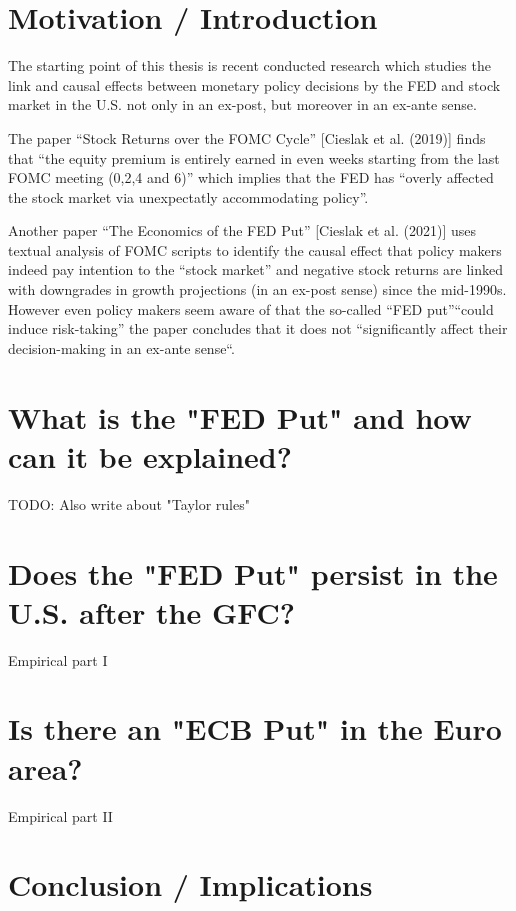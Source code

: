 
\chapter{Motivation / Introduction}

The starting point of this thesis is recent conducted research which studies the link and causal effects between monetary policy decisions by the FED and stock market in the U.S. not only in an ex-post, but moreover in an ex-ante sense.

The paper “Stock Returns over the FOMC Cycle” [Cieslak et al. (2019)] finds that “the equity premium is entirely earned in even weeks starting from the last FOMC meeting (0,2,4 and 6)” which implies that the FED has “overly affected the stock market via unexpectatly accommodating policy”.

Another paper “The Economics of the FED Put”  [Cieslak et al. (2021)] uses textual analysis of FOMC scripts to identify the causal effect that policy makers indeed pay intention to the “stock market” and negative stock returns are linked with downgrades in growth projections (in an ex-post sense) since the mid-1990s.  However even policy makers seem aware of that the so-called “FED put”“could induce risk-taking” the paper concludes that it does not “significantly affect their decision-making in an ex-ante sense“.


\chapter{What is the "FED Put" and how can it be explained?}

TODO: Also write about "Taylor rules"

\chapter{Does the "FED Put" persist in the U.S.  after the GFC?}

Empirical part I

\chapter{Is there an "ECB Put" in the Euro area?}

Empirical part II

\chapter{Conclusion / Implications}
